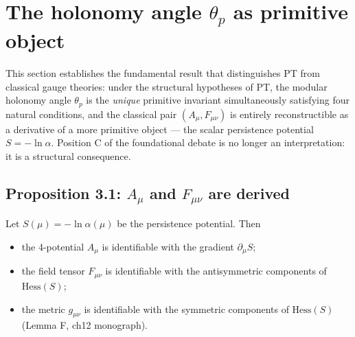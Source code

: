 \section{The holonomy angle $\theta_p$ as primitive object}
\label{sec:holonomy_primitive}

This section establishes the fundamental result that distinguishes
PT from classical gauge theories: under the structural hypotheses
of PT, the modular holonomy angle $\theta_p$ is the
\emph{unique} primitive invariant simultaneously satisfying four
natural conditions, and the classical pair $(A_\mu, F_{\mu\nu})$
is entirely reconstructible as a derivative of a more primitive
object --- the scalar persistence potential $S = -\ln \alpha$.
Position C of the foundational debate is no longer an
interpretation: it is a structural consequence.

\subsection{Proposition 3.1: $A_\mu$ and $F_{\mu\nu}$ are derived}
\label{ssec:prop_3_1_en}

\begin{proposition}
\label{prop:A_F_derived_en}
Let $S(\mu) = -\ln \alpha(\mu)$ be the persistence potential. Then
\begin{itemize}
  \item the 4-potential $A_\mu$ is identifiable with the gradient
  $\partial_\mu S$;
  \item the field tensor $F_{\mu\nu}$ is identifiable with the
  antisymmetric components of $\mathrm{Hess}(S)$;
  \item the metric $g_{\mu\nu}$ is identifiable with the symmetric
  components of $\mathrm{Hess}(S)$ (Lemma F, ch12 monograph).
\end{itemize}
\end{proposition}

